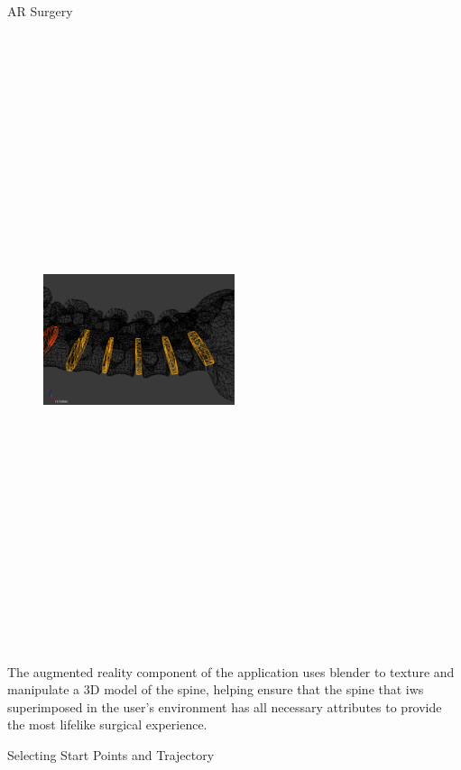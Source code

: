 \documentclass[final]{beamer}
\newlength{\onecolwid}
\begin{document}
\begin{frame}[t]
\begin{columns}[t]
\begin{column}{\onecolwid}
\begin{block}{\LARGE AR Surgery}
\begin{figure}
\centering
\includegraphics[width=0.5\textwidth,height=18cm]{spine.png}

\end{figure}
\large
The augmented reality component of the application uses blender to texture and manipulate a 3D model of the spine, helping ensure that the spine that iws superimposed in the user's environment has all necessary attributes to provide the most lifelike surgical experience.

\end{block}


\begin{block}{\LARGE Selecting Start Points and Trajectory}


\end{block}
\end{column}
\end{columns}
\end{frame}
\end{document}
